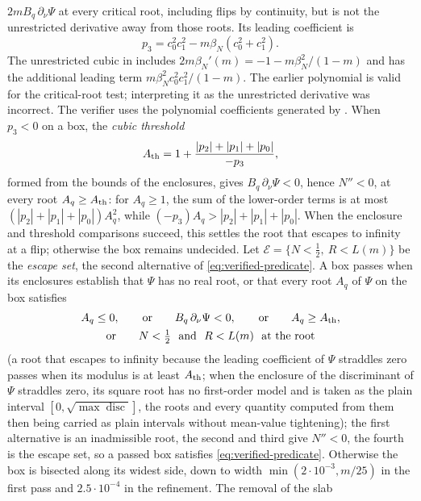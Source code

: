 \documentclass[11pt]{article}
\theoremstyle{remark}
\begin{document}
$2mB_q\,\partial_\nu\Psi$ at every critical root, including flips by
continuity, but is not the unrestricted derivative away from those roots.
Its leading coefficient is
\[
 p_3=c_0^2c_1^2-m\beta_N(c_0^2+c_1^2).
\]
The unrestricted cubic in  includes
$2m\beta_N'(m)=-1-m\beta_N^2/(1-m)$ and has the additional leading term
$m\beta_N^2c_0^2c_1^2/(1-m)$.  The earlier polynomial is valid for the
critical-root test; interpreting it as the unrestricted derivative was
incorrect.  The verifier uses the polynomial coefficients generated by
.  When
$p_3<0$ on a box, the \emph{cubic threshold}
\[
 A_{\rm th}=1+\frac{|p_2|+|p_1|+|p_0|}{-p_3},
\]
formed from the bounds of the enclosures, gives $B_q\,\partial_\nu\Psi<0$,
hence $N''<0$, at every root $A_q\ge A_{\rm th}$: for $A_q\ge1$,
the sum of the lower-order terms is at most
$(|p_2|+|p_1|+|p_0|)A_q^2$, while
$(-p_3)A_q>|p_2|+|p_1|+|p_0|$.  When the enclosure and threshold comparisons succeed, this settles the
root that escapes to infinity at a flip; otherwise the box remains undecided.  Let
$\mathcal E=\{N<\tfrac12,\ R<L(m)\}$ be the \emph{escape set}, the
second alternative of \eqref{eq:verified-predicate}.  A box passes when
its enclosures establish that $\Psi$ has no real root, or that every root
$A_q$ of $\Psi$ on the box satisfies
\begin{equation}\label{eq:box-predicate}
 \begin{gathered}
 A_q\le0,\qquad\text{or}\qquad B_q\,\partial_\nu\Psi<0,\qquad\text{or}\qquad
 A_q\ge A_{\rm th},\\
 \text{or}\qquad N<\tfrac12\ \text{ and }\ R<L(m)\ \text{ at the root}
 \end{gathered}
\end{equation}
(a root that escapes to infinity because the leading coefficient of
$\Psi$ straddles zero passes when its modulus is at least $A_{\rm th}$; when the
enclosure of the discriminant of $\Psi$ straddles zero, its square root
has no first-order model and is taken as the plain interval
$[0,\sqrt{\max\operatorname{disc}}]$, the roots and every quantity
computed from them then being carried as plain intervals without
mean-value tightening); the
first alternative is an inadmissible root, the second and third give
$N''<0$, the fourth is the escape set, so a passed box satisfies
\eqref{eq:verified-predicate}.  Otherwise the box is bisected along its
widest side, down to width $\min(2\cdot10^{-3},m/25)$ in the first pass
and $2.5\cdot10^{-4}$ in the refinement.  The removal of the slab
\end{document}

